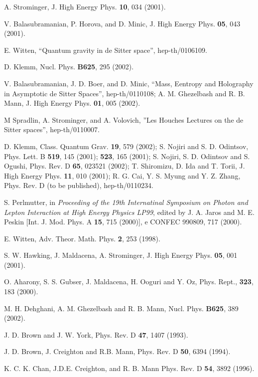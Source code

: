 \documentclass[a4paper,12pt,onecolumn]{revtex4}
\begin{document}
\begin{thebibliography}{99}
  A. Strominger, J. High Energy Phys. \textbf{10},
034 (2001).

  V. Balasubramanian, P. Horova, and D. Minic, J. High Energy Phys. \textbf{05},
043 (2001).

  E. Witten, ``Quantum gravity in de Sitter space'',
hep-th/0106109.

  D. Klemm, Nucl. Phys. \textbf{B625}, 295 (2002).

  V. Balasubramanian, J. D. Boer, and D. Minic, ``Mass, Eentropy
and Holography in Asymptotic de Sitter Spaces'', hep-th/0110108;
A. M. Ghezelbash and R. B. Mann, J. High Energy Phys. \textbf{01},
005 (2002).

  M Spradlin, A. Strominger, and A. Volovich, ''Les Houches
Lectures on the de Sitter spaces'', hep-th/0110007.

  D. Klemm, Class. Quantum Grav. \textbf{19}, 579
(2002); S. Nojiri and S. D. Odintsov, Phys. Lett. B \textbf{519},
145 (2001); \textbf{523}, 165 (2001); S. Nojiri, S. D. Odintsov
and S. Ogushi, Phys. Rev. D \textbf{65}, 023521 (2002); T.
Shiromizu, D. Ida and T. Torii, J. High Energy Phys. \textbf{11},
010 (2001); R. G. Cai, Y. S. Myung and Y. Z. Zhang, Phys. Rev. D
(to be published), hep-th/0110234.

  S. Perlmutter, in \emph{Proceeding
of the 19th Internatinal Symposium on Photon and Lepton
Interaction at High Energy Physics LP99}, edited by J. A. Jaros
and M. E. Peskin [Int. J. Mod. Phys. A \textbf{15}, 715 (2000)], e
CONFEC 990809, 717 (2000).

  E. Witten, Adv. Theor. Math. Phys. \textbf{2}, 253 (1998).

  S. W. Hawking, J. Maldacena, A. Strominger, J. High Energy Phys. \textbf{05},
001 (2001).

  O. Aharony, S. S. Gubser, J. Maldacena, H. Ooguri and Y. Oz,
Phys. Rept., \textbf{323}, 183 (2000).

  M. H. Dehghani, A. M. Ghezelbash and R. B. Mann, Nucl. Phys.
\textbf{B625}, 389 (2002).

  J. D. Brown and J. W. York, Phys. Rev. D \textbf{47}, 1407 (1993).

  J. D. Brown, J. Creighton and R.B. Mann, Phys. Rev. D \textbf{50},
6394 (1994).

  K. C. K. Chan, J.D.E. Creighton, and R. B. Mann Phys.
Rev. D \textbf{54}, 3892 (1996).


\end{thebibliography}
\end{document}
